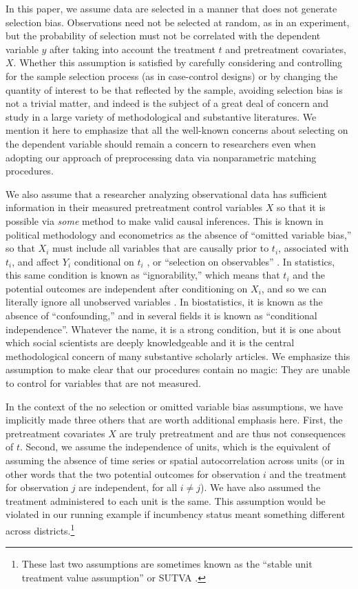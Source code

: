 \documentclass[11pt,titlepage]{article}
\begin{document}
In this paper, we assume data are selected in a manner that does not
generate selection bias.  Observations need not be selected at random,
as in an experiment, but the probability of selection must not be
correlated with the dependent variable $y$ after taking into account
the treatment $t$ and pretreatment covariates, $X$.  Whether this
assumption is satisfied by carefully considering and controlling for
the sample selection process (as in case-control designs) or by
changing the quantity of interest to be that reflected by the sample,
avoiding selection bias is not a trivial matter, and indeed is the
subject of a great deal of concern and study in a large variety of
methodological and substantive literatures.  We mention it here to
emphasize that all the well-known concerns about selecting on the
dependent variable should remain a concern to researchers even when
adopting our approach of preprocessing data via nonparametric matching
procedures.

We also assume that a researcher analyzing observational data has
sufficient information in their measured pretreatment control
variables $X$ so that it is possible via \emph{some} method to make
valid causal inferences.  This is known in political methodology and
econometrics as the absence of ``omitted variable bias,'' so that
$X_i$ must include all variables that are causally prior to $t_i$,
associated with $t_i$, and affect $Y_i$ conditional on $t_i$
\citep{Goldberger91,KinKeoVer94}, or ``selection on observables''
\citep{HecRob85}.  In statistics, this same condition is known as
``ignorability,'' which means that $t_i$ and the potential outcomes
are independent after conditioning on $X_i$, and so we can literally
ignore all unobserved variables \citep{RosRub83}.  In biostatistics,
it is known as the absence of ``confounding,'' and in several fields it
is known as ``conditional independence''.  Whatever the name, it is a
strong condition, but it is one about which social scientists are
deeply knowledgeable and it is the central methodological concern of
many substantive scholarly articles.  We emphasize this assumption to
make clear that our procedures contain no magic: They are unable to
control for variables that are not measured.

In the context of the no selection or omitted variable bias
assumptions, we have implicitly made three others that are worth
additional emphasis here.  First, the pretreatment covariates $X$ are
truly pretreatment and are thus not consequences of $t$.  Second, we
assume the independence of units, which is the equivalent of assuming
the absence of time series or spatial autocorrelation across units (or
in other words that the two potential outcomes for observation $i$ and
the treatment for observation $j$ are independent, for all $i\not=j$).
We have also assumed the treatment administered to each unit is the
same.  This assumption would be violated in our running example if
incumbency status meant something different across
districts.\footnote{These last two assumptions are sometimes known as
  the ``stable unit treatment value assumption'' or SUTVA
  \citep{Rubin74}.}
\end{document}
